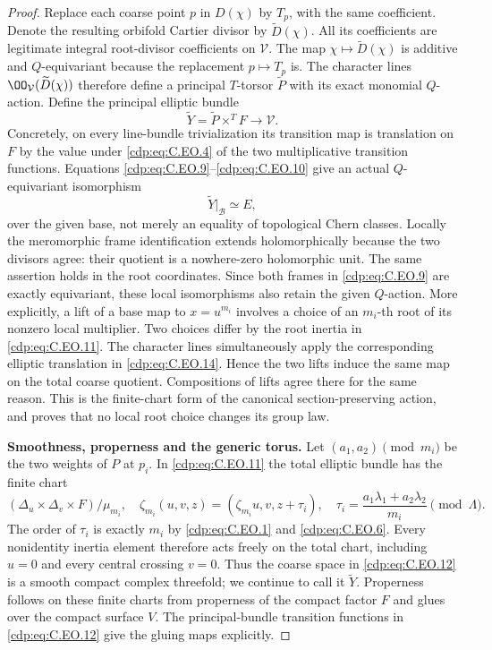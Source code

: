 \begin{proof}
Replace each coarse point $p$ in
$D(\chi)$ by $T_p$, with the same
coefficient. Denote the resulting
orbifold Cartier divisor by
$\widetilde D(\chi)$. All its
coefficients are legitimate integral
root-divisor coefficients on
$\mathcal V$. The map
$\chi\mapsto\widetilde D(\chi)$ is
additive and $Q$-equivariant because
the replacement $p\mapsto T_p$ is.
The character lines
$\OO_{\mathcal V}(\widetilde D(\chi))$
therefore define a principal $T$-torsor
$\widetilde P$ with its exact monomial
$Q$-action. Define the principal
elliptic bundle
\[
              \widetilde Y
                =\widetilde P\mathbin{\times^T}F
                     \longrightarrow\mathcal V .   \tag{C.EO.12}\label{cdp:eq:C.EO.12}
\]
Concretely, on every line-bundle
trivialization its transition map is
translation on $F$ by the value under
\eqref{cdp:eq:C.EO.4} of the two multiplicative
transition functions. Equations
\eqref{cdp:eq:C.EO.9}--\eqref{cdp:eq:C.EO.10} give an actual
$Q$-equivariant isomorphism
\[
                   \widetilde Y|_{\mathcal B}
                                   \simeq E,         \tag{C.EO.13}\label{cdp:eq:C.EO.13}
\]
over the given base, not merely
an equality of topological Chern
classes. Locally the meromorphic
frame identification extends
holomorphically because the two
divisors agree: their quotient is
a nowhere-zero holomorphic unit.
The same assertion holds in the
root coordinates. Since both
frames in \eqref{cdp:eq:C.EO.9} are exactly
equivariant, these local isomorphisms
also retain the given $Q$-action.
More explicitly, a lift of a base
map to $x=u^{m_i}$ involves a
choice of an $m_i$-th root of
its nonzero local multiplier.
Two choices differ by the
root inertia in \eqref{cdp:eq:C.EO.11}.
The character lines simultaneously
apply the corresponding elliptic
translation in \eqref{cdp:eq:C.EO.14}.
Hence the two lifts induce the
same map on the total coarse
quotient. Compositions of lifts
agree there for the same reason.
This is the finite-chart form
of the canonical section-preserving
action, and proves that no local
root choice changes its group law.

\par\medskip\noindent\textbf{Smoothness, properness and the generic torus.}
Let $(a_1,a_2)\pmod {m_i}$ be the
two weights of $P$ at $p_i$.
In \eqref{cdp:eq:C.EO.11} the total elliptic
bundle has the finite chart
\[
 (\Delta_u\times\Delta_v\times F)/\mu_{m_i},
 \quad
 \zeta_{m_i}(u,v,z)
     =(\zeta_{m_i}u,v,z+\tau_i),\quad
 \tau_i=\frac{a_1\lambda_1+a_2\lambda_2}{m_i}
                                           \pmod\Lambda .
                                                               \tag{C.EO.14}\label{cdp:eq:C.EO.14}
\]
The order of $\tau_i$ is exactly
$m_i$ by \eqref{cdp:eq:C.EO.1} and \eqref{cdp:eq:C.EO.6}.
Every nonidentity inertia element
therefore acts freely on the total
chart, including $u=0$ and every
central crossing $v=0$. Thus the
coarse space in \eqref{cdp:eq:C.EO.12} is a
smooth compact complex threefold;
we continue to call it
$\widetilde Y$. Properness follows
on these finite charts from
properness of the compact factor
$F$ and glues over the compact
surface $V$. The principal-bundle
transition functions in \eqref{cdp:eq:C.EO.12}
give the gluing maps explicitly.


\end{proof}
